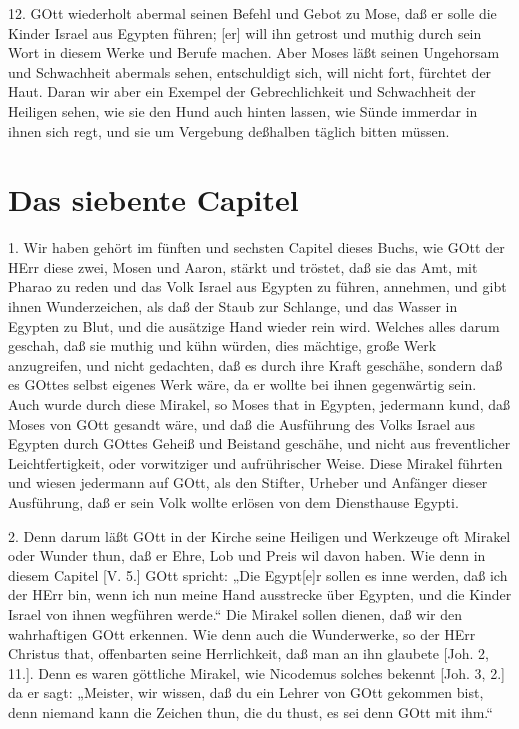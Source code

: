 12. GOtt wiederholt abermal seinen Befehl und Gebot zu Mose, daß er solle die Kinder Israel aus Egypten führen; [er] will ihn getrost und muthig durch sein Wort in diesem Werke und Berufe machen. Aber Moses läßt seinen Ungehorsam und Schwachheit abermals sehen, entschuldigt sich, will nicht fort, fürchtet der Haut. Daran wir aber ein Exempel der Gebrechlichkeit und Schwachheit der Heiligen sehen, wie sie den Hund auch hinten lassen, wie Sünde immerdar in ihnen sich regt, und sie um Vergebung deßhalben täglich bitten müssen.

\section{Das siebente Capitel}

1. Wir haben gehört im fünften und sechsten Capitel dieses Buchs, wie GOtt der HErr diese zwei, Mosen und Aaron, stärkt und tröstet, daß sie das Amt, mit Pharao zu reden und das Volk Israel aus Egypten zu führen, annehmen, und gibt ihnen Wunderzeichen, als daß der Staub zur Schlange, und das Wasser in Egypten zu Blut, und die ausätzige Hand wieder rein wird. Welches alles darum geschah, daß sie muthig und kühn würden, dies mächtige, große Werk anzugreifen, und nicht gedachten, daß es durch ihre Kraft geschähe, sondern daß es GOttes selbst eigenes Werk wäre, da er wollte bei ihnen gegenwärtig sein. Auch wurde durch diese Mirakel, so Moses that in Egypten, jedermann kund, daß Moses von GOtt gesandt wäre, und daß die Ausführung des Volks Israel aus Egypten durch GOttes Geheiß und Beistand geschähe, und nicht aus freventlicher Leichtfertigkeit, oder vorwitziger und aufrührischer Weise. Diese Mirakel führten und wiesen jedermann auf GOtt, als den Stifter, Urheber und Anfänger dieser Ausführung, daß er sein Volk wollte erlösen von dem Diensthause Egypti.

2. Denn darum läßt GOtt in der Kirche seine Heiligen und Werkzeuge oft Mirakel oder Wunder thun, daß er Ehre, Lob und Preis wil davon haben. Wie denn in diesem Capitel [V. 5.] GOtt spricht: „Die Egypt[e]r sollen es inne werden, daß ich der HErr bin, wenn ich nun meine Hand ausstrecke über Egypten, und die Kinder Israel von ihnen wegführen werde.“ Die Mirakel sollen dienen, daß wir den wahrhaftigen GOtt erkennen. Wie denn auch die Wunderwerke, so der HErr Christus that, offenbarten seine Herrlichkeit, daß man an ihn glaubete [Joh. 2, 11.]. Denn es waren göttliche Mirakel, wie Nicodemus solches bekennt [Joh. 3, 2.] da
er sagt: „Meister, wir wissen, daß du ein Lehrer von GOtt gekommen bist, denn niemand kann die Zeichen thun, die du thust, es sei denn GOtt mit ihm.“

